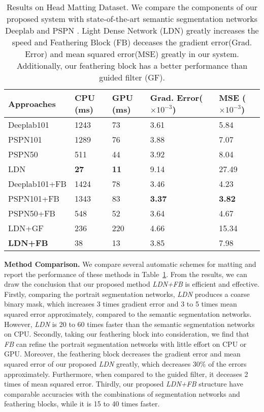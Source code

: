 \documentclass[sigconf]{acmart}
\begin{document}
\begin{table}[ht]
\caption{Results on Head Matting Dataset. We compare the components of our proposed system with state-of-the-art semantic segmentation networks Deeplab and PSPN \cite{chen2014semantic, zhao2016pyramid}. Light Dense Network (LDN) greatly increases the speed and Feathering Block (FB) deceases the gradient error(Grad. Error) and mean squared error(MSE) greatly in our system. Additionally, our feathering block has a better performance than guided filter (GF).}
\begin{tabular}{p{2.3cm}p{0.7cm}p{0.7cm}p{1.8cm}p{1.2cm}}
\toprule
Approaches &CPU (ms) &GPU (ms) &Grad. Error($\times 10^{-3}$) &MSE ($\times 10^{-3}$) \\ \midrule
Deeplab101 \cite{chen2014semantic} &   1243 &   73 &   3.61 & 5.84\\
PSPN101 \cite{zhao2016pyramid} &   1289 &   76 &   3.88 & 7.07 \\
PSPN50 \cite{zhao2016pyramid} &   511 &   44 &   3.92 & 8.04 \\
LDN &  \textbf{27} &  \textbf{11} &  9.14 & 27.49 \\
Deeplab101+FB & 1424 & 78 & 3.46 & 4.23 \\
PSPN101+FB & 1343 & 83 & \textbf{3.37} & \textbf{3.82} \\
PSPN50+FB & 548 & 52 & 3.64 & 4.67 \\
LDN+GF & 236 & 220 & 4.66 & 15.34 \\
\hline
\textbf{LDN+FB} & 38 & 13 & 3.85 & 7.98  \\
\bottomrule
\end{tabular}\label{tab:headdata}
\end{table}\textbf{Method Comparison.} We compare several automatic schemes for matting and report the performance of these methods in Table~\ref{tab:headdata}. From the results, we can draw the conclusion that our proposed method \emph{LDN+FB} is efficient and effective. Firstly, comparing the portrait segmentation networks, \emph{LDN} produces a coarse binary mask, which increases 3 times gradient error and 3 to 5 times mean squared error approximately, compared to the semantic segmentation networks. However, \emph{LDN} is 20 to 60 times faster than the semantic segmentation networks on CPU. Secondly, taking our feathering block into consideration, we find that \emph{FB} can refine the portrait segmentation networks with little effort on CPU or GPU. Moreover, the feathering block decreases the gradient error and mean squared error of our proposed \emph{LDN} greatly, which decreases $30\%$ of the errors approximately. Furthermore, when compared to the guided filter, it deceases 2 times of mean squared  error. Thirdly, our proposed \emph{LDN+FB} structure have comparable accuracies with the combinations of segmentation networks and feathering blocks, while it is 15 to 40 times faster.
\end{document}
